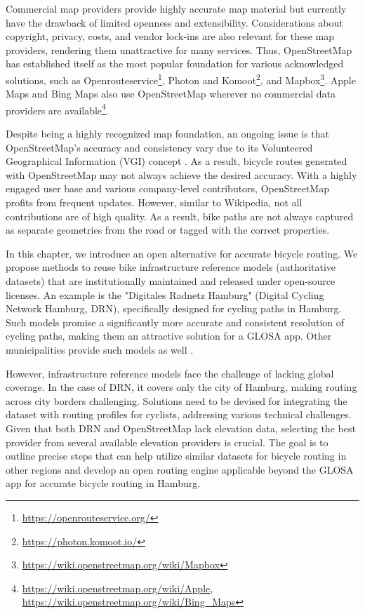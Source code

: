Commercial map providers provide highly accurate map material but currently have the drawback of limited openness and extensibility. Considerations about copyright, privacy, costs, and vendor lock-ins are also relevant for these map providers, rendering them unattractive for many services. Thus, OpenStreetMap has established itself as the most popular foundation for various acknowledged solutions, such as Openrouteservice\footnote{\url{https://openrouteservice.org/}}, Photon and Komoot\footnote{\url{https://photon.komoot.io/}}, and Mapbox\footnote{\url{https://wiki.openstreetmap.org/wiki/Mapbox}}. Apple Maps and Bing Maps also use OpenStreetMap wherever no commercial data providers are available\footnote{\url{https://wiki.openstreetmap.org/wiki/Apple}, \url{https://wiki.openstreetmap.org/wiki/Bing_Maps}}. 

Despite being a highly recognized map foundation, an ongoing issue is that OpenStreetMap's accuracy and consistency vary due to its Volunteered Geographical Information (VGI) concept \cite{wasserman_evaluating_2019, jacobs_openstreetmap_2020, vybornova_automated_2023}. As a result, bicycle routes generated with OpenStreetMap may not always achieve the desired accuracy. With a highly engaged user base and various company-level contributors, OpenStreetMap profits from frequent updates. However, similar to Wikipedia, not all contributions are of high quality. As a result, bike paths are not always captured as separate geometries from the road or tagged with the correct properties.

In this chapter, we introduce an open alternative for accurate bicycle routing. We propose methods to reuse bike infrastructure reference models (authoritative datasets) that are institutionally maintained and released under open-source licenses. An example is the "Digitales Radnetz Hamburg" (Digital Cycling Network Hamburg, DRN), specifically designed for cycling paths in Hamburg. Such models promise a significantly more accurate and consistent resolution of cycling paths, making them an attractive solution for a GLOSA app. Other municipalities provide such models as well \cite{englede_efficient_2013, brovelli_towards_2017}. 

However, infrastructure reference models face the challenge of lacking global coverage. In the case of DRN, it covers only the city of Hamburg, making routing across city borders challenging. Solutions need to be devised for integrating the dataset with routing profiles for cyclists, addressing various technical challenges. Given that both DRN and OpenStreetMap lack elevation data, selecting the best provider from several available elevation providers is crucial. The goal is to outline precise steps that can help utilize similar datasets for bicycle routing in other regions and develop an open routing engine applicable beyond the GLOSA app for accurate bicycle routing in Hamburg.

